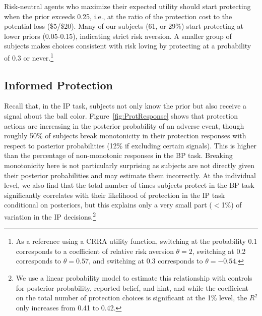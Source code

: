 \documentclass[12pt,a4paper]{article}
\begin{document}

Risk-neutral agents who maximize their expected utility should start protecting when the prior exceeds 0.25, i.e., at the ratio of the protection cost to the potential loss (\$5/\$20). Many of our subjects (61, or 29\%) start protecting at lower priors (0.05-0.15), indicating strict risk aversion.  A smaller group of subjects makes choices consistent with risk loving by protecting at a probability of 0.3 or never.\footnote{As a reference using a CRRA utility function, switching at the probability 0.1 corresponds to a coefficient of relative risk aversion $\theta=2$, switching at 0.2 corresponds to $\theta=0.57$, and switching at 0.3 corresponds to $\theta=-0.54$.} 


\subsection{Informed Protection}

Recall that, in the IP task, subjects not only know the prior but also receive a signal about the ball color. 
Figure~\ref{fig:ProtResponse} shows that protection actions are increasing in the posterior probability of an adverse event, though roughly 50\% of subjects break monotonicity in their protection responses with respect to posterior probabilities (12\% if excluding certain signals). This is higher than the percentage of non-monotonic responses in the BP task.  Breaking monotonicity here is not particularly surprising as subjects are not directly given their posterior probabilities and may estimate them incorrectly. At the individual level, we also find that the total number of times subjects protect in the BP task significantly correlates with their likelihood of protection in the IP task conditional on posteriors, but this explains only a very small part ($<$1\%) of variation in the IP decisions.\footnote{We use a linear probability model to estimate this relationship with controls for posterior probability, reported belief, and hint, and while the coefficient on the total number of protection choices is significant at the 1\% level, the $R^2$ only increases from 0.41 to 0.42.} 


\end{document}
